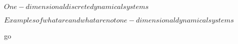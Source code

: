 \documentclass[../Main/main]{subfiles}
\begin{document}
\unit{ $ One-dimensional discrete dynamical systems $ }
{
	\introduction
	{ 
		$Examples of what are and what are not one-dimensional dynamical systems$ 
	}

	go

}
\end{document}
